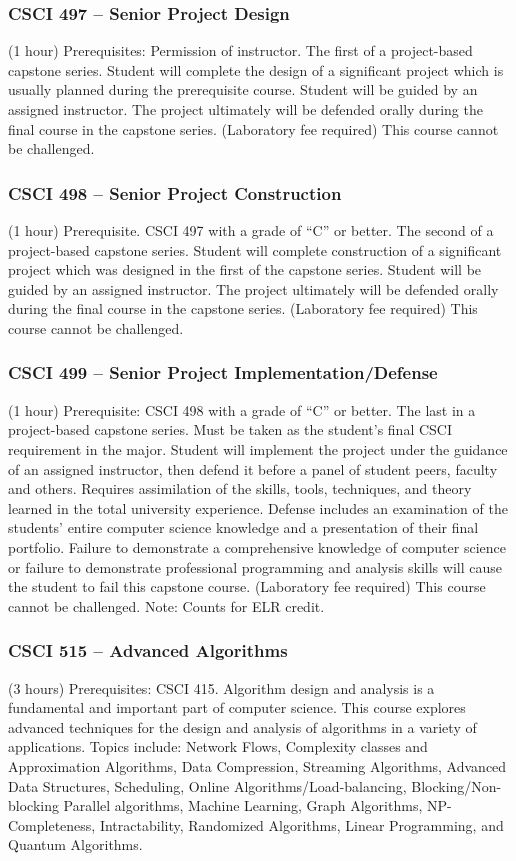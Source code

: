 \subsubsection{CSCI 497 -- Senior Project Design}
(1 hour) Prerequisites: Permission of instructor. The first of a project-based capstone series. Student will complete the design of a significant project which is usually planned during the prerequisite course. Student will be guided by an assigned instructor. The project ultimately will be defended orally during the final course in the capstone series. (Laboratory fee required) This course cannot be challenged.

\clearpage

\subsubsection{CSCI 498 -- Senior Project Construction}
(1 hour) Prerequisite. CSCI 497 with a grade of “C” or better. The second of a project-based capstone series. Student will complete construction of a significant project which was designed in the first of the capstone series. Student will be guided by an assigned instructor. The project ultimately will be defended orally during the final course in the capstone series. (Laboratory fee required) This course cannot be challenged.

\subsubsection{CSCI 499 -- Senior Project Implementation/Defense}
(1 hour) Prerequisite: CSCI 498 with a grade of “C” or better. The last in a project-based capstone series. Must be taken as the student’s final CSCI requirement in the major. Student will implement the project under the guidance of an assigned instructor, then defend it before a panel of student peers, faculty and others. Requires assimilation of the skills, tools, techniques, and theory learned in the total university experience. Defense includes an examination of the students’ entire computer science knowledge and a presentation of their final portfolio. Failure to demonstrate a comprehensive knowledge of computer science or failure to demonstrate professional programming and analysis skills will cause the student to fail this capstone course. (Laboratory fee required) This course cannot be challenged. Note: Counts for ELR credit.

\subsubsection{CSCI 515 -- Advanced Algorithms}
(3 hours) Prerequisites: CSCI 415. Algorithm design and analysis is a fundamental and important part of computer science.   This course explores advanced techniques for the design and analysis of algorithms in a variety of applications.  Topics include: Network Flows, Complexity classes and Approximation Algorithms, Data Compression, Streaming Algorithms, Advanced Data Structures, Scheduling, Online Algorithms/Load-balancing, Blocking/Non-blocking Parallel algorithms, Machine Learning, Graph Algorithms, NP-Completeness, Intractability, Randomized Algorithms, Linear Programming, and Quantum Algorithms.

